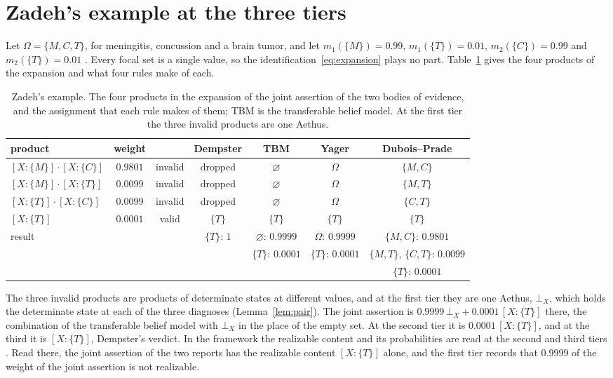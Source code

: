 \section{Zadeh's example at the three tiers}\label{sec:zadeh}

Let $\Omega = \{M, C, T\}$, for meningitis, concussion and a brain tumor, and let $m_1(\{M\}) = 0.99$, $m_1(\{T\}) = 0.01$, $m_2(\{C\}) = 0.99$ and $m_2(\{T\}) = 0.01$ \cite{zadeh1984}. Every focal set is a single value, so the identification~\eqref{eq:expansion} plays no part. Table~\ref{tab:zadeh} gives the four products of the expansion and what four rules make of each.

\begin{table}[ht]
\centering\small
\setlength{\tabcolsep}{4pt}
\begin{tabular}{@{}lcccccc@{}}
\toprule
product & weight & & Dempster & TBM & Yager & Dubois--Prade\\
\midrule
$[X:\{M\}]\cdot[X:\{C\}]$ & $0.9801$ & invalid & dropped & $\varnothing$ & $\Omega$ & $\{M, C\}$\\
$[X:\{M\}]\cdot[X:\{T\}]$ & $0.0099$ & invalid & dropped & $\varnothing$ & $\Omega$ & $\{M, T\}$\\
$[X:\{T\}]\cdot[X:\{C\}]$ & $0.0099$ & invalid & dropped & $\varnothing$ & $\Omega$ & $\{C, T\}$\\
$[X:\{T\}]$ & $0.0001$ & valid & $\{T\}$ & $\{T\}$ & $\{T\}$ & $\{T\}$\\
\midrule
result & & & $\{T\}$: $1$ & $\varnothing$: $0.9999$ & $\Omega$: $0.9999$ & $\{M,C\}$: $0.9801$\\
 & & & & $\{T\}$: $0.0001$ & $\{T\}$: $0.0001$ & $\{M,T\}$, $\{C,T\}$: $0.0099$\\
 & & & & & & $\{T\}$: $0.0001$\\
\bottomrule
\end{tabular}
\caption{\small Zadeh's example. The four products in the expansion of the joint assertion of the two bodies of evidence, and the assignment that each rule makes of them; TBM is the transferable belief model. At the first tier the three invalid products are one Aethus.}
\label{tab:zadeh}
\end{table}

The three invalid products are products of determinate states at different values, and at the first tier they are one Aethus, $\bot_X$, which holds the determinate state at each of the three diagnoses (Lemma~\ref{lem:pair}). The joint assertion is $0.9999\,\bot_X + 0.0001\,[X:\{T\}]$ there, the combination of the transferable belief model with $\bot_X$ in the place of the empty set. At the second tier it is $0.0001\,[X:\{T\}]$, and at the third it is $[X:\{T\}]$, Dempster's verdict. In the framework the realizable content and its probabilities are read at the second and third tiers \cite{Aethus}. Read there, the joint assertion of the two reports has the realizable content $[X:\{T\}]$ alone, and the first tier records that $0.9999$ of the weight of the joint assertion is not realizable.

